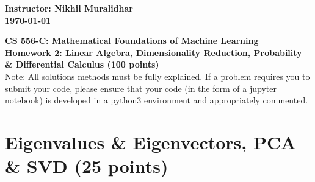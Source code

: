 \documentclass{article}%
\begin{document}
\begin{flushleft}
\textbf{Instructor: Nikhil Muralidhar \\
\today}
\end{flushleft}

\begin{center}
\textbf{\Large CS 556-C: Mathematical Foundations of Machine Learning \\
Homework 2: Linear Algebra, Dimensionality Reduction, Probability \& Differential Calculus (100 points)} \\
\vspace{2ex}
Note: All solutions methods must be fully explained. If a problem requires you to submit your code, please ensure that your code (in the form of a jupyter notebook) is developed in a python3 environment and appropriately commented.
\end{center}

\section*{Eigenvalues \& Eigenvectors, PCA \& SVD (25 points)}
\end{document}
